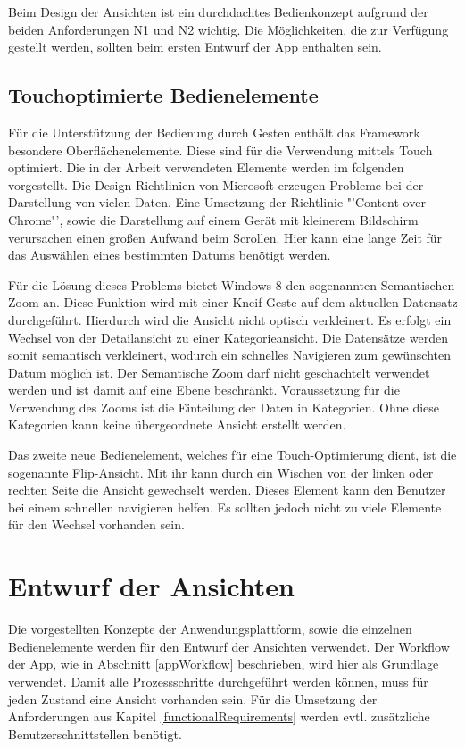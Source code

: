 Beim Design der Ansichten ist ein durchdachtes Bedienkonzept aufgrund der beiden Anforderungen N1 und N2 wichtig. Die Möglichkeiten, die zur Verfügung gestellt werden, sollten beim ersten Entwurf der App enthalten sein.

\subsection{Touchoptimierte Bedienelemente}
Für die Unterstützung der Bedienung durch Gesten enthält das Framework besondere Oberflächenelemente. Diese sind für die Verwendung mittels Touch optimiert. Die in der Arbeit verwendeten Elemente werden im folgenden vorgestellt.
Die Design Richtlinien von Microsoft erzeugen Probleme bei der Darstellung von vielen Daten. Eine Umsetzung der Richtlinie "'Content over Chrome"', sowie die Darstellung auf einem Gerät mit kleinerem Bildschirm verursachen einen großen Aufwand beim Scrollen. Hier kann eine lange Zeit für das Auswählen eines bestimmten Datums benötigt werden. \par

Für die Lösung dieses Problems bietet Windows 8 den sogenannten Semantischen Zoom an. Diese Funktion wird mit einer Kneif-Geste auf dem aktuellen Datensatz durchgeführt. Hierdurch wird die Ansicht nicht optisch verkleinert. Es erfolgt ein Wechsel von der Detailansicht zu einer Kategorieansicht. Die Datensätze werden somit semantisch verkleinert, wodurch ein schnelles Navigieren zum gewünschten Datum möglich ist. Der Semantische Zoom darf nicht geschachtelt verwendet werden und ist damit auf eine Ebene beschränkt. Voraussetzung für die Verwendung des Zooms ist die Einteilung der Daten in Kategorien. Ohne diese Kategorien kann keine übergeordnete Ansicht erstellt werden.

Das zweite neue Bedienelement, welches für eine Touch-Optimierung dient, ist die sogenannte Flip-Ansicht. Mit ihr kann durch ein Wischen von der linken oder rechten Seite die Ansicht gewechselt werden. Dieses Element kann den Benutzer bei einem schnellen navigieren helfen. Es sollten jedoch nicht zu viele Elemente für den Wechsel vorhanden sein.

\section{Entwurf der Ansichten}
Die vorgestellten Konzepte der Anwendungsplattform, sowie die einzelnen Bedienelemente werden für den Entwurf der Ansichten verwendet. Der Workflow der App, wie in Abschnitt \ref{appWorkflow} beschrieben, wird hier als Grundlage verwendet. Damit alle Prozessschritte durchgeführt werden können, muss für jeden Zustand eine Ansicht vorhanden sein. Für die Umsetzung der Anforderungen aus Kapitel \ref{functionalRequirements} werden evtl. zusätzliche Benutzerschnittstellen benötigt.


